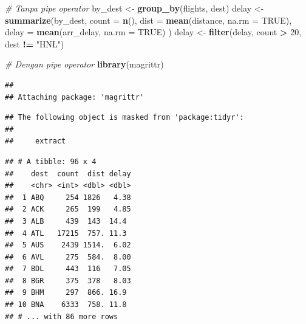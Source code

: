 \documentclass[]{book}
\newenvironment{Shaded}{\begin{snugshade}}{\end{snugshade}}
\newcommand{\KeywordTok}[1]{\textcolor[rgb]{0.13,0.29,0.53}{\textbf{#1}}}
\newcommand{\DataTypeTok}[1]{\textcolor[rgb]{0.13,0.29,0.53}{#1}}
\newcommand{\DecValTok}[1]{\textcolor[rgb]{0.00,0.00,0.81}{#1}}
\newcommand{\StringTok}[1]{\textcolor[rgb]{0.31,0.60,0.02}{#1}}
\newcommand{\CommentTok}[1]{\textcolor[rgb]{0.56,0.35,0.01}{\textit{#1}}}
\newcommand{\OtherTok}[1]{\textcolor[rgb]{0.56,0.35,0.01}{#1}}
\newcommand{\OperatorTok}[1]{\textcolor[rgb]{0.81,0.36,0.00}{\textbf{#1}}}
\newcommand{\NormalTok}[1]{#1}
\begin{document}
\begin{Shaded}
\begin{Highlighting}[]
\CommentTok{# Tanpa pipe operator}
\NormalTok{by_dest <-}\StringTok{ }\KeywordTok{group_by}\NormalTok{(flights, dest)}
\NormalTok{delay <-}\StringTok{ }\KeywordTok{summarize}\NormalTok{(by_dest,}
  \DataTypeTok{count =} \KeywordTok{n}\NormalTok{(),}
  \DataTypeTok{dist =} \KeywordTok{mean}\NormalTok{(distance, }\DataTypeTok{na.rm =} \OtherTok{TRUE}\NormalTok{),}
  \DataTypeTok{delay =} \KeywordTok{mean}\NormalTok{(arr_delay, }\DataTypeTok{na.rm =} \OtherTok{TRUE}\NormalTok{)}
\NormalTok{)}
\NormalTok{delay <-}\StringTok{ }\KeywordTok{filter}\NormalTok{(delay, count }\OperatorTok{>}\StringTok{ }\DecValTok{20}\NormalTok{, dest }\OperatorTok{!=}\StringTok{ "HNL"}\NormalTok{)}

\CommentTok{# Dengan pipe operator}
\KeywordTok{library}\NormalTok{(magrittr)}
\end{Highlighting}
\end{Shaded}

\begin{verbatim}
## 
## Attaching package: 'magrittr'
\end{verbatim}

\begin{verbatim}
## The following object is masked from 'package:tidyr':
## 
##     extract
\end{verbatim}

\begin{Shaded}
\end{Shaded}

\begin{verbatim}
## # A tibble: 96 x 4
##    dest  count  dist delay
##    <chr> <int> <dbl> <dbl>
##  1 ABQ     254 1826   4.38
##  2 ACK     265  199   4.85
##  3 ALB     439  143  14.4 
##  4 ATL   17215  757. 11.3 
##  5 AUS    2439 1514.  6.02
##  6 AVL     275  584.  8.00
##  7 BDL     443  116   7.05
##  8 BGR     375  378   8.03
##  9 BHM     297  866. 16.9 
## 10 BNA    6333  758. 11.8 
## # ... with 86 more rows
\end{verbatim}
\end{document}

